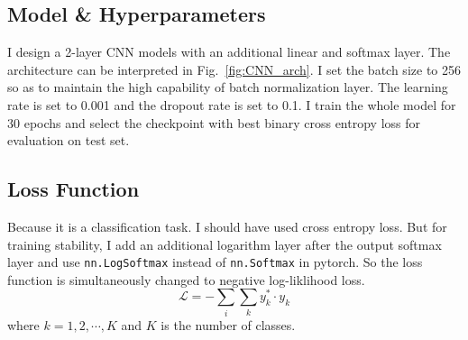 \subsection{Model \& Hyperparameters}
I design a 2-layer CNN models with an additional linear and softmax layer. The architecture can be interpreted in Fig.~\ref{fig:CNN_arch}. 
I set the batch size to 256 so as to maintain the high capability of batch normalization layer. 
The learning rate is set to 0.001 and the dropout rate is set to 0.1.
I train the whole model for 30 epochs and select the checkpoint with best binary cross entropy loss for evaluation on test set.

\subsection{Loss Function}
Because it is a classification task. I should have used cross entropy loss. 
But for training stability, I add an additional logarithm layer after the output softmax layer and use \verb|nn.LogSoftmax| instead of \verb|nn.Softmax| in pytorch.
So the loss function is simultaneously changed to negative log-liklihood loss.
\begin{equation}
    \label{eq:nllloss}
    \mathcal{L}=-\sum_{i}\sum_{k}y_k^*\cdot y_k
\end{equation}
where $k=1,2,\cdots, K$ and $K$ is the number of classes.

